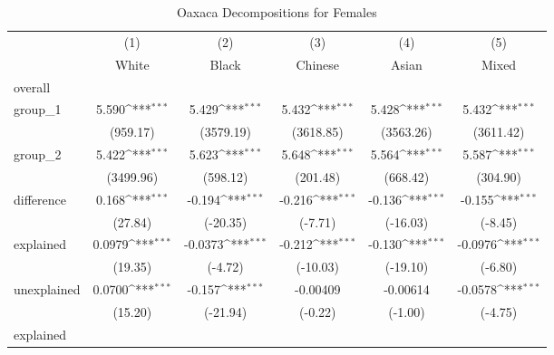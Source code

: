 \begin{table}[htbp]\centering
\def\sym#1{\ifmmode^{#1}\else\(^{#1}\)\fi}
\caption{Oaxaca Decompositions for Females\label{tab1}}
\begin{tabular}{l*{5}{c}}
\hline\hline
            &\multicolumn{1}{c}{(1)}&\multicolumn{1}{c}{(2)}&\multicolumn{1}{c}{(3)}&\multicolumn{1}{c}{(4)}&\multicolumn{1}{c}{(5)}\\
            &\multicolumn{1}{c}{White}&\multicolumn{1}{c}{Black}&\multicolumn{1}{c}{Chinese}&\multicolumn{1}{c}{Asian}&\multicolumn{1}{c}{Mixed}\\
\hline
overall     &                     &                     &                     &                     &                     \\
group\_1     &       5.590\sym{***}&       5.429\sym{***}&       5.432\sym{***}&       5.428\sym{***}&       5.432\sym{***}\\
            &    (959.17)         &   (3579.19)         &   (3618.85)         &   (3563.26)         &   (3611.42)         \\
group\_2     &       5.422\sym{***}&       5.623\sym{***}&       5.648\sym{***}&       5.564\sym{***}&       5.587\sym{***}\\
            &   (3499.96)         &    (598.12)         &    (201.48)         &    (668.42)         &    (304.90)         \\
difference  &       0.168\sym{***}&      -0.194\sym{***}&      -0.216\sym{***}&      -0.136\sym{***}&      -0.155\sym{***}\\
            &     (27.84)         &    (-20.35)         &     (-7.71)         &    (-16.03)         &     (-8.45)         \\
explained   &      0.0979\sym{***}&     -0.0373\sym{***}&      -0.212\sym{***}&      -0.130\sym{***}&     -0.0976\sym{***}\\
            &     (19.35)         &     (-4.72)         &    (-10.03)         &    (-19.10)         &     (-6.80)         \\
unexplained &      0.0700\sym{***}&      -0.157\sym{***}&    -0.00409         &    -0.00614         &     -0.0578\sym{***}\\
            &     (15.20)         &    (-21.94)         &     (-0.22)         &     (-1.00)         &     (-4.75)         \\
\hline
explained   &                     &                     &                     &                     &                     \\

\end{tabular}
\end{table}
